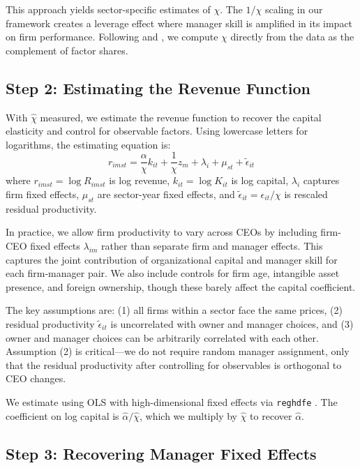 \documentclass[11pt,a4paper]{article}
\begin{document}
This approach yields sector-specific estimates of $\chi$. The $1/\chi$ scaling in our framework creates a leverage effect where manager skill is amplified in its impact on firm performance. Following \citet{Halpern2015-se} and \citet{Gandhi2020-nu}, we compute $\chi$ directly from the data as the complement of factor shares.

\subsection{Step 2: Estimating the Revenue Function}

With $\hat{\chi}$ measured, we estimate the revenue function to recover the capital elasticity and control for observable factors. Using lowercase letters for logarithms, the estimating equation is:
\begin{equation}
r_{imst} = \frac{\alpha}{\chi} k_{it} + \frac{1}{\chi}z_m + \lambda_i + \mu_{st} + \tilde{\epsilon}_{it}
\end{equation}
where $r_{imst} = \log R_{imst}$ is log revenue, $k_{it} = \log K_{it}$ is log capital, $\lambda_i$ captures firm fixed effects, $\mu_{st}$ are sector-year fixed effects, and $\tilde{\epsilon}_{it} = \epsilon_{it}/\chi$ is rescaled residual productivity.

In practice, we allow firm productivity to vary across CEOs by including firm-CEO fixed effects $\lambda_{im}$ rather than separate firm and manager effects. This captures the joint contribution of organizational capital and manager skill for each firm-manager pair. We also include controls for firm age, intangible asset presence, and foreign ownership, though these barely affect the capital coefficient.

The key assumptions are: (1) all firms within a sector face the same prices, (2) residual productivity $\tilde{\epsilon}_{it}$ is uncorrelated with owner and manager choices, and (3) owner and manager choices can be arbitrarily correlated with each other. Assumption (2) is critical—we do not require random manager assignment, only that the residual productivity after controlling for observables is orthogonal to CEO changes.

We estimate using OLS with high-dimensional fixed effects via \texttt{reghdfe} \citep{reghdfe}. The coefficient on log capital is $\hat{\alpha}/\hat{\chi}$, which we multiply by $\hat{\chi}$ to recover $\hat{\alpha}$.

\subsection{Step 3: Recovering Manager Fixed Effects}
\end{document}

